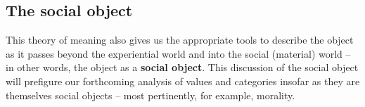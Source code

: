 





\subsection{The social object}\label{sec:theory:social}
This theory of meaning also gives us the appropriate tools to describe the object as it passes beyond the experiential world and into the social (material) world -- in other words, the object as a \textbf{social object}. This discussion of the social object will prefigure our forthcoming analysis of values and categories insofar as they are themselves social objects -- most pertinently, for example, morality.


